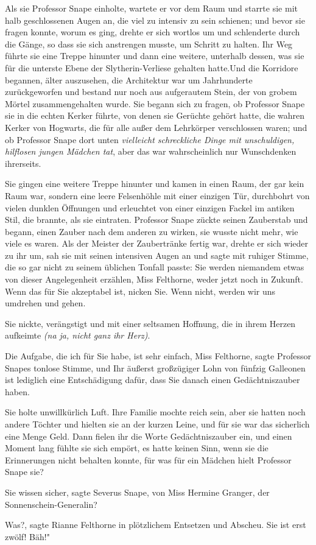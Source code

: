 Als sie Professor Snape einholte, wartete er vor dem Raum und starrte sie mit
halb geschlossenen Augen an, die viel zu intensiv zu sein schienen; und bevor
sie fragen konnte, worum es ging, drehte er sich wortlos um und schlenderte
durch die Gänge, so dass sie sich anstrengen musste, um Schritt zu halten. Ihr
Weg führte sie eine Treppe hinunter und dann eine weitere, unterhalb dessen, was
sie für die unterste Ebene der Slytherin-Verliese gehalten hatte.Und die
Korridore begannen, älter auszusehen, die Architektur war um Jahrhunderte
zurückgeworfen und bestand nur noch aus aufgerautem Stein, der von grobem Mörtel
zusammengehalten wurde. Sie begann sich zu fragen, ob Professor Snape sie in die
echten Kerker führte, von denen sie Gerüchte gehört hatte, die wahren Kerker von
Hogwarts, die für alle außer dem Lehrkörper verschlossen waren; und ob Professor
Snape dort unten\emph{ vielleicht schreckliche Dinge mit unschuldigen, hilflosen
jungen Mädchen tat}, aber das war wahrscheinlich nur Wunschdenken ihrerseits.

Sie gingen eine weitere Treppe hinunter und kamen in einen Raum, der gar kein
Raum war, sondern eine leere Felsenhöhle mit einer einzigen Tür, durchbohrt von
vielen dunklen Öffnungen und erleuchtet von einer einzigen Fackel im antiken
Stil, die brannte, als sie eintraten. Professor Snape zückte seinen Zauberstab
und begann, einen Zauber nach dem anderen zu wirken, sie wusste nicht mehr, wie
viele es waren. Als der Meister der Zaubertränke fertig war, drehte er sich
wieder zu ihr um, sah sie mit seinen intensiven Augen an und sagte mit ruhiger
Stimme, die so gar nicht zu seinem üblichen Tonfall passte: \glqq Sie werden
niemandem etwas von dieser Angelegenheit erzählen, Miss Felthorne, weder jetzt
noch in Zukunft. Wenn das für Sie akzeptabel ist, nicken Sie. Wenn nicht, werden
wir uns umdrehen und gehen.\grqq{}

Sie nickte, verängstigt und mit einer seltsamen Hoffnung, die in ihrem Herzen
aufkeimte \emph{(na ja, nicht ganz ihr Herz)}.

\glqq Die Aufgabe, die ich für Sie habe, ist sehr einfach, Miss
Felthorne\grqq{}, sagte Professor Snapes tonlose Stimme, \glqq und Ihr äußerst
großzügiger Lohn von fünfzig Galleonen ist lediglich eine Entschädigung dafür,
dass Sie danach einen Gedächtniszauber haben.\grqq{}

Sie holte unwillkürlich Luft. Ihre Familie mochte reich sein, aber sie hatten
noch andere Töchter und hielten sie an der kurzen Leine, und für sie war das
sicherlich eine Menge Geld. Dann fielen ihr die Worte Gedächtniszauber ein, und
einen Moment lang fühlte sie sich empört, es hatte keinen Sinn, wenn sie die
Erinnerungen nicht behalten konnte, für was für ein Mädchen hielt Professor
Snape sie?

\glqq Sie wissen sicher\grqq{}, sagte Severus Snape, \glqq von Miss Hermine
Granger, der Sonnenschein-Generalin?\grqq{}

\glqq Was?\grqq{}, sagte Rianne Felthorne in plötzlichem Entsetzen und Abscheu.
\glqq Sie ist erst zwölf! Bäh!"

